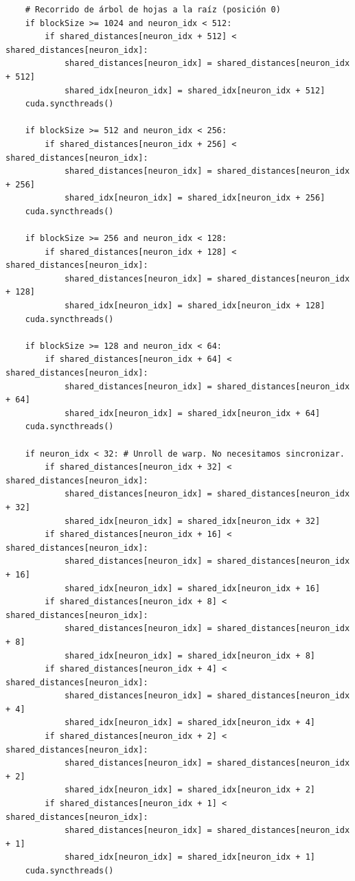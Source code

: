 \begin{code}
\begin{verbatim}
    # Recorrido de árbol de hojas a la raíz (posición 0)
    if blockSize >= 1024 and neuron_idx < 512:
        if shared_distances[neuron_idx + 512] < shared_distances[neuron_idx]:
            shared_distances[neuron_idx] = shared_distances[neuron_idx + 512]
            shared_idx[neuron_idx] = shared_idx[neuron_idx + 512]
    cuda.syncthreads()
    
    if blockSize >= 512 and neuron_idx < 256:
        if shared_distances[neuron_idx + 256] < shared_distances[neuron_idx]:
            shared_distances[neuron_idx] = shared_distances[neuron_idx + 256]
            shared_idx[neuron_idx] = shared_idx[neuron_idx + 256]
    cuda.syncthreads()
    
    if blockSize >= 256 and neuron_idx < 128:
        if shared_distances[neuron_idx + 128] < shared_distances[neuron_idx]:
            shared_distances[neuron_idx] = shared_distances[neuron_idx + 128]
            shared_idx[neuron_idx] = shared_idx[neuron_idx + 128]
    cuda.syncthreads()
    
    if blockSize >= 128 and neuron_idx < 64:
        if shared_distances[neuron_idx + 64] < shared_distances[neuron_idx]:
            shared_distances[neuron_idx] = shared_distances[neuron_idx + 64]
            shared_idx[neuron_idx] = shared_idx[neuron_idx + 64]
    cuda.syncthreads()
    
    if neuron_idx < 32: # Unroll de warp. No necesitamos sincronizar.
        if shared_distances[neuron_idx + 32] < shared_distances[neuron_idx]:
            shared_distances[neuron_idx] = shared_distances[neuron_idx + 32]
            shared_idx[neuron_idx] = shared_idx[neuron_idx + 32]
        if shared_distances[neuron_idx + 16] < shared_distances[neuron_idx]:
            shared_distances[neuron_idx] = shared_distances[neuron_idx + 16]
            shared_idx[neuron_idx] = shared_idx[neuron_idx + 16]
        if shared_distances[neuron_idx + 8] < shared_distances[neuron_idx]:
            shared_distances[neuron_idx] = shared_distances[neuron_idx + 8]
            shared_idx[neuron_idx] = shared_idx[neuron_idx + 8]
        if shared_distances[neuron_idx + 4] < shared_distances[neuron_idx]:
            shared_distances[neuron_idx] = shared_distances[neuron_idx + 4]
            shared_idx[neuron_idx] = shared_idx[neuron_idx + 4]
        if shared_distances[neuron_idx + 2] < shared_distances[neuron_idx]:
            shared_distances[neuron_idx] = shared_distances[neuron_idx + 2]
            shared_idx[neuron_idx] = shared_idx[neuron_idx + 2]
        if shared_distances[neuron_idx + 1] < shared_distances[neuron_idx]:
            shared_distances[neuron_idx] = shared_distances[neuron_idx + 1]
            shared_idx[neuron_idx] = shared_idx[neuron_idx + 1]
    cuda.syncthreads()
    

\end{verbatim}
\end{code}

